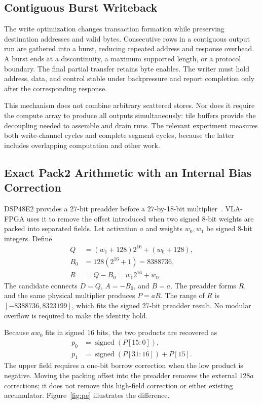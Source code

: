 \documentclass[10pt,conference,letterpaper]{IEEEtran}
\begin{document}
\subsection{Contiguous Burst Writeback}
The write optimization changes transaction formation while preserving destination addresses and valid bytes. Consecutive rows in a contiguous output run are gathered into a burst, reducing repeated address and response overhead. A burst ends at a discontinuity, a maximum supported length, or a protocol boundary. The final partial transfer retains byte enables. The writer must hold address, data, and control stable under backpressure and report completion only after the corresponding response.

This mechanism does not combine arbitrary scattered stores. Nor does it require the compute array to produce all outputs simultaneously: tile buffers provide the decoupling needed to assemble and drain runs. The relevant experiment measures both write-channel cycles and complete segment cycles, because the latter includes overlapping computation and other work.

\subsection{Exact Pack2 Arithmetic with an Internal Bias Correction}
\label{sec:pe}
DSP48E2 provides a 27-bit preadder before a 27-by-18-bit multiplier~\cite{ug579}. VLA-FPGA uses it to remove the offset introduced when two signed 8-bit weights are packed into separated fields. Let activation $a$ and weights $w_0,w_1$ be signed 8-bit integers. Define
\begin{align}
Q&=(w_1+128)2^{16}+(w_0+128),\\
B_0&=128(2^{16}+1)=8388736,\\
R&=Q-B_0=w_1 2^{16}+w_0.
\end{align}
The candidate connects $D=Q$, $A=-B_0$, and $B=a$. The preadder forms $R$, and the same physical multiplier produces $P=aR$. The range of $R$ is $[-8388736,8323199]$, which fits the signed 27-bit preadder result. No modular overflow is required to make the identity hold.

Because $aw_0$ fits in signed 16 bits, the two products are recovered as
\begin{align}
p_0&=\operatorname{signed}(P[15:0]),\\
p_1&=\operatorname{signed}(P[31:16])+P[15].
\label{eq:extract}
\end{align}
The upper field requires a one-bit borrow correction when the low product is negative. Moving the packing offset into the preadder removes the external $128a$ corrections; it does not remove this high-field correction or either existing accumulator. Figure~\ref{fig:pe} illustrates the difference.
\end{document}
